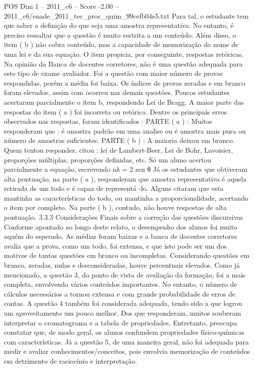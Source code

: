 \begin{textsample}{POS Dim 1 – 2011\_c6 – Score -2.00 – 2011\_c6/enade\_2011\_tec\_proc\_quim\_99cefb04e5.txt}
Para tal, o estudante tem que saber a definição do que seja uma amostra representativa.
No entanto, é preciso ressaltar que a questão é muito restrita a um conteúdo.
Além disso, o item ( b ) não cobra conteúdo, mas a capacidade de memorização do nome de uma lei e da sua equação.
O item propicia, por conseguinte, respostas retóricas.
Na opinião da Banca de docentes corretores, não é uma questão adequada para este tipo de exame avaliador.
Foi a questão com maior número de provas respondidas, porém a média foi baixa.
Os índices de provas zeradas e em branco foram elevados, assim com ocorreu nas demais questões.
Poucos estudantes acertaram parcialmente o item b, respondendo Lei de Bragg.
A maior parte das respostas do item ( a ) foi incorreta ou retórica.
Dentre os principais erros observados nas respostas, foram identificados : PARTE ( a ) : Muitos responderam que : é amostra padrão em uma analise ou é amostra mais pura ou número de amostras suficientes.
PARTE ( b ) : A maioria deixou em branco.
Quem tentou responder, citou : lei de Lambert-Beer, Lei de Bohr, Lavoisier, proporções múltiplas, proporções definidas, etc.
Só um aluno acertou parcialmente a equação, escrevendo nλ = 2 sen θ Já os estudantes que obtiveram alta pontuação, na parte ( a ), responderam que amostra representativa é aquela retirada de um todo e é capaz de representá -lo.
Alguns citaram que esta mantinha as características do todo, ou mantinha a proporcionalidade, acertando o item por completo.
Na parte ( b ), contudo, não houve respostas de alta pontuação. 3.3.3 Considerações Finais sobre a correção das questões discursivas Conforme apontado ao longo deste relato, o desempenho dos alunos foi muito aquém do esperado.
As médias foram baixas e a banca de docentes corretores avalia que a prova, como um todo, foi extensa, e que isto pode ser um dos motivos de tantas questões em branco ou incompletas.
Considerando questões em branco, zeradas, nulas e desconsideradas, houve percentuais elevados.
Como já mencionado, a questão 3, do ponto de vista de avaliação da formação, foi a mais completa, envolvendo vários conteúdos importantes.
No entanto, o número de cálculos necessários a tornou extensa e com grande probabilidade de erros de contas.
A questão 4 também foi considerada adequada, tendo sido a que logrou um aproveitamento um pouco melhor.
Dos que responderam, muitos souberam interpretar o cromatograma e a tabela de propriedades.
Entretanto, preocupa constatar que, de modo geral, os alunos confundem propriedades físico-químicas com características.
Já a questão 5, de uma maneira geral, não foi adequada para medir e avaliar conhecimentos/conceitos, pois envolvia memorização de conteúdos em detrimento de raciocínio e interpretação.

\end{textsample}

